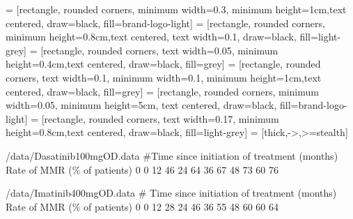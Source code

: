 

 = [rectangle, rounded corners, minimum width=0.3\textwidth, minimum height=1cm,text centered, draw=black, fill=brand-logo-light]
 = [rectangle, rounded corners, minimum height=0.8cm,text centered, text width=0.1\textwidth, draw=black, fill=light-grey]
 = [rectangle, rounded corners, text width=0.05\textwidth, minimum height=0.4cm,text centered, draw=black, fill=grey]
 = [rectangle, rounded corners, text width=0.1\textwidth, minimum width=0.1\textwidth, minimum height=1cm,text centered, draw=black, fill=grey]
 = [rectangle, rounded corners, minimum width=0.05\textwidth, minimum height=5cm, text centered, draw=black, fill=brand-logo-light]
 = [rectangle, rounded corners, text width=0.17\textwidth, minimum height=0.8cm,text centered, draw=black, fill=light-grey]
 = [thick,->,>=stealth]



\begin{filecontents}{\pathtomanuscript/data/Dasatinib100mgOD.data}
#Time since initiation of treatment (months) 	Rate of MMR (\% of patients)
0	0
12	46
24	64
36	67
48	73
60	76
\end{filecontents}

\begin{filecontents}{\pathtomanuscript/data/Imatinib400mgOD.data}
# Time since initiation of treatment (months) 	Rate of MMR (\% of patients)
0	0
12	28
24	46
36	55
48	60
60	64
\end{filecontents}

\ccyrdata

\mmrdata